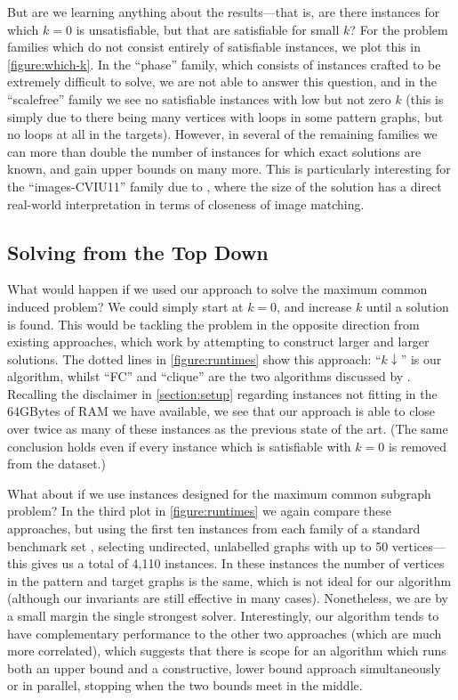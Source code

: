 \documentclass[letterpaper]{article}
\newcommand{\citet}[1]{\citeauthor{#1} \shortcite{#1}}
\newcommand{\citep}[1]{\cite{#1}}
\theoremstyle{definition}
\begin{document}
But are we learning anything about the results---that is, are there instances for which $k = 0$ is
unsatisfiable, but that are satisfiable for small $k$? For the problem families which do not consist
entirely of satisfiable instances, we plot this in \cref{figure:which-k}. In the ``phase'' family,
which consists of instances crafted to be extremely difficult to solve, we are not able to answer
this question, and in the ``scalefree'' family we see no satisfiable instances with low but not zero
$k$ (this is simply due to there being many vertices with loops in some pattern graphs, but no loops
at all in the targets). However, in several of the remaining families we can more than double the
number of instances for which exact solutions are known, and gain upper bounds on many more. This is
particularly interesting for the ``images-CVIU11'' family due to \citet{cviu11}, where the size of
the solution has a direct real-world interpretation in terms of closeness of image matching.

\subsection{Solving from the Top Down}\label{section:topdown}

What would happen if we used our approach to solve the maximum common induced problem? We could
simply start at $k = 0$, and increase $k$ until a solution is found. This would be tackling the
problem in the opposite direction from existing approaches, which work by attempting to construct
larger and larger solutions. The dotted lines in \cref{figure:runtimes} show this approach: ``$k
\downarrow$'' is our algorithm, whilst ``FC'' and ``clique'' are the two algorithms discussed by
\citet{DBLP:conf/cp/McCreeshNPS16}.  Recalling the disclaimer in \cref{section:setup}
regarding instances not fitting in the 64GBytes of RAM we have available, we see that our approach is
able to close over twice as many of these instances as the previous state of the art. (The same
conclusion holds even if every instance which is satisfiable with $k = 0$ is removed from the
dataset.)

What about if we use instances designed for the maximum common subgraph problem? In the third plot
in \cref{figure:runtimes} we again compare these approaches, but using the first ten instances from
each family of a standard benchmark set
\citep{DBLP:journals/prl/SantoFSV03,DBLP:journals/jgaa/ConteFV07}, selecting undirected, unlabelled
graphs with up to 50 vertices---this gives us a total of 4,110 instances. In these instances the
number of vertices in the pattern and target graphs is the same, which is not ideal for our
algorithm (although our invariants are still effective in many cases). Nonetheless, we are by a
small margin the single strongest solver. Interestingly, our algorithm tends to have complementary
performance to the other two approaches (which are much more correlated), which suggests that there
is scope for an algorithm which runs both an upper bound and a constructive, lower bound approach
simultaneously or in parallel, stopping when the two bounds meet in the middle.
\end{document}
